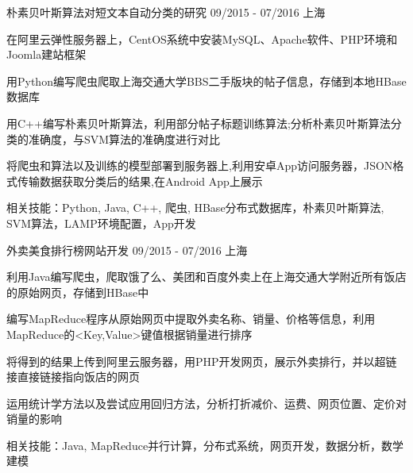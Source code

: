 

\begin{cventries}

  \cventry
    { } %
    { 朴素贝叶斯算法对短文本自动分类的研究} %
    {09/2015 - 07/2016} %
    {上海} %
    {
    \vspace{-8pt}
      \begin{cvitems} %
        \item {在阿里云弹性服务器上，CentOS系统中安装MySQL、Apache软件、PHP环境和Joomla建站框架}
        \item {用Python编写爬虫爬取上海交通大学BBS二手版块的帖子信息，存储到本地HBase数据库}
        \item{用C++编写朴素贝叶斯算法，利用部分帖子标题训练算法;分析朴素贝叶斯算法分类的准确度，与SVM算法的准确度进行对比}
        \item{将爬虫和算法以及训练的模型部署到服务器上,利用安卓App访问服务器，JSON格式传输数据获取分类后的结果,在Android App上展示}
        \item{相关技能：Python, Java, C++,  爬虫, HBase分布式数据库，朴素贝叶斯算法, SVM算法，LAMP环境配置，App开发}
      \end{cvitems}
    }
\vspace{5pt}
  \cventry
    {} %
    {外卖美食排行榜网站开发} %
    {09/2015 - 07/2016} %
    {上海} %
    {
    \vspace{-8pt}
      \begin{cvitems} %
        \item {利用Java编写爬虫，爬取饿了么、美团和百度外卖上在上海交通大学附近所有饭店的原始网页，存储到HBase中}
        \item {编写MapReduce程序从原始网页中提取外卖名称、销量、价格等信息，利用MapReduce的<Key,Value>键值根据销量进行排序}
        \item {将得到的结果上传到阿里云服务器，用PHP开发网页，展示外卖排行，并以超链接直接链接指向饭店的网页}
        \item {运用统计学方法以及尝试应用回归方法，分析打折减价、运费、网页位置、定价对销量的影响}
        \item {相关技能：Java, MapReduce并行计算，分布式系统，网页开发，数据分析，数学建模}
      \end{cvitems}
    }


\end{cventries}
